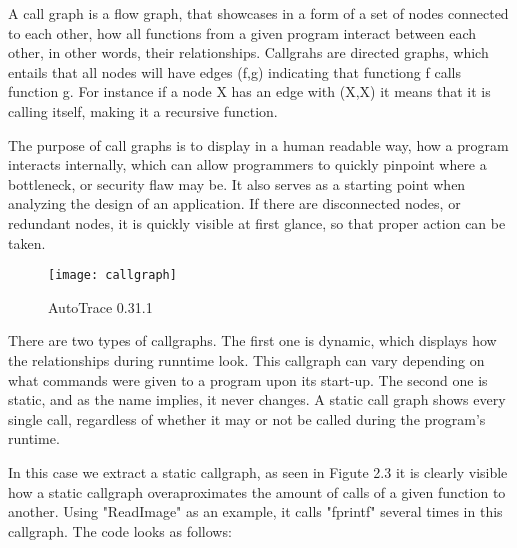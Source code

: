 A call graph is a flow graph, that showcases in a form of a set of nodes connected to each other, how all functions from a given program interact between each other, in other words, their relationships. Callgrahs are directed graphs, which entails that all nodes will have edges (f,g) indicating that functiong f calls function g. For instance if a node X has an edge with (X,X) it means that it is calling itself, making it a recursive function.

The purpose of call graphs is to display in a human readable way, how a program interacts internally, which can allow programmers to quickly pinpoint where a bottleneck, or security flaw may be. It also serves as a starting point when analyzing the design of an application. If there are disconnected nodes, or redundant nodes, it is quickly visible at first glance, so that proper action can be taken.

\begin{figure}[!htb]
	\caption{AutoTrace 0.31.1}
	\centering
	\texttt{[image: callgraph]}
\end{figure}

There are two types of callgraphs. The first one is dynamic, which displays how the relationships during runntime look. This callgraph can vary depending on what commands were given to a program upon its start-up. The second one is static, and as the name implies, it never changes. A static call graph shows every single call, regardless of whether it may or not be called during the program's runtime.\parencite{callgraphs}

In this case we extract a static callgraph, as seen in Figute 2.3 it is clearly visible how a static callgraph overaproximates the amount of calls of a given function to another. Using "ReadImage" as an example, it calls "fprintf" several times in this callgraph. The code looks as follows:


